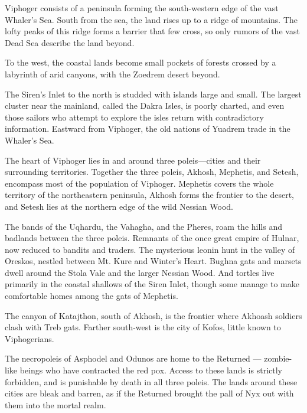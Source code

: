 Viphoger consists of a peninsula forming the south-western edge of the vast Whaler's Sea.
South from the sea, the land rises up to a ridge of mountains.
The lofty peaks of this ridge forms a barrier that few cross, so only rumors of the vast Dead Sea describe the land beyond.

To the west, the coastal lands become small pockets of forests crossed by a labyrinth of arid canyons, with the Zoedrem desert beyond.

The Siren's Inlet to the north is studded with islands large and small.
The largest cluster near the mainland, called the Dakra Isles, is poorly charted, and even those sailors who attempt to explore the isles return with contradictory information.
Eastward from Viphoger, the old nations of Yuadrem trade in the Whaler's Sea. %

The heart of Viphoger lies in and around three poleis—cities and their surrounding territories.
Together the three poleis, Akhosh, Mephetis, and Setesh, encompass most of the population of Viphoger.
Mephetis covers the whole territory of the northeastern peninsula, Akhosh forms the frontier to the desert, and Setesh lies at the northern edge of the wild Nessian Wood.

The bands of the Uqhardu, the Vahagha, and the Pheres, roam the hills and badlands between the three poleis.
Remnants of the once great empire of Hulnar, now reduced to bandits and traders.
The mysterious leonin hunt in the valley of Oreskos, nestled between Mt. Kure and Winter's Heart.
Bughna gats and marsets dwell around the Stola Vale and the larger Nessian Wood.
And tortles live primarily in the coastal shallows of the Siren Inlet, though some manage to make comfortable homes among the gats of Mephetis.

The canyon of Katajthon, south of Akhosh, is the frontier where Akhoash soldiers clash with Treb gats.
Farther south-west is the city of Kofos, little known to Viphogerians.

The necropoleis of Asphodel and Odunos are home to the Returned --- zombie-like beings who have contracted the red pox.
Access to these lands is strictly forbidden, and is punishable by death in all three poleis.
The lands around these cities are bleak and barren, as if the Returned brought the pall of Nyx out with them into the mortal realm.









